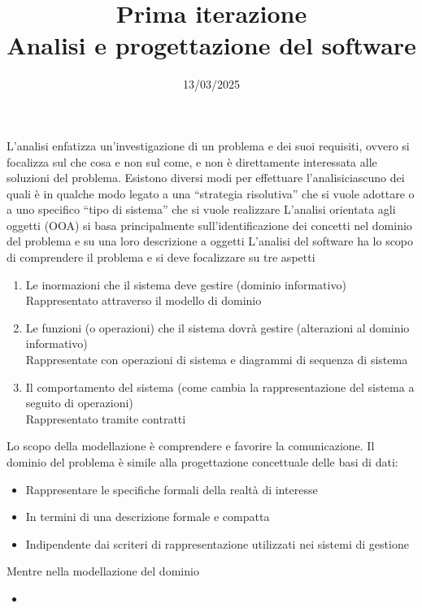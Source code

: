 \documentclass{article}
\title{Prima iterazione\\\normalsize Analisi e progettazione del software}
\date{13/03/2025}
\begin{document}
\maketitle
L'analisi enfatizza un'investigazione di un problema e dei suoi requisiti, ovvero si focalizza sul che cosa e non sul come, e non è direttamente interessata alle soluzioni del problema.\acapo
Esistono diversi modi per effettuare l'analisiciascuno dei quali è in qualche modo legato a una “strategia risolutiva” che si vuole adottare o a uno specifico “tipo di sistema” che si vuole realizzare\acapo
L'analisi orientata agli oggetti (OOA) si basa principalmente sull'identificazione dei concetti nel dominio del problema e su una loro descrizione a oggetti\acapo
L'analisi del software ha lo scopo di comprendere il problema e si deve focalizzare su tre aspetti
\begin{enumerate}
    \item Le inormazioni che il sistema deve gestire (dominio informativo)\\
        Rappresentato attraverso il modello di dominio
    \item Le funzioni (o operazioni) che il sistema dovrà gestire (alterazioni al dominio informativo)\\
        Rappresentate con operazioni di sistema e diagrammi di sequenza di sistema
    \item Il comportamento del sistema (come cambia la rappresentazione del sistema a seguito di operazioni)\\
        Rappresentato tramite contratti
\end{enumerate}
Lo scopo della modellazione è comprendere e favorire la comunicazione.\acapo
Il dominio del problema è simile alla progettazione concettuale delle basi di dati:
\begin{itemize}
    \item Rappresentare le specifiche formali della realtà di interesse
    \item In termini di una descrizione formale e compatta
    \item Indipendente dai scriteri di rappresentazione utilizzati nei sistemi di gestione
\end{itemize}
Mentre nella modellazione del dominio
\begin{itemize}
    \item 
\end{itemize}
\end{document}
